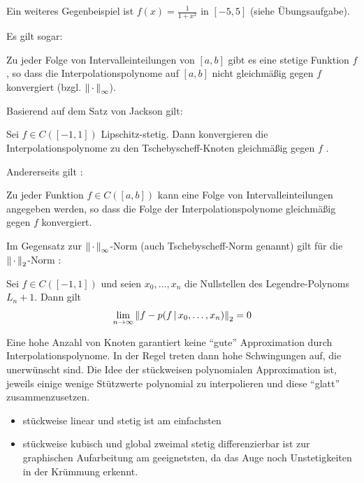 Ein weiteres Gegenbeispiel ist $f(x)=\frac{1}{1+x^2}$ in $[-5,5]$ 
(siehe Übungsaufgabe).

Es gilt sogar:

\begin{Satze}[Faber]
  Zu jeder Folge von Intervalleinteilungen von $[a,b]$
  gibt es eine stetige Funktion $f$ ,
  so dass die Interpolationspolynome auf $[a, b]$
  nicht gleichmäßig gegen $f$ konvergiert 
  (bzgl. $\left\| \,\cdot\, \right\|_\infty$).
\end{Satze}

Basierend auf dem Satz von Jackson gilt:
\begin{Satze}
  Sei $f\in C([-1,1])$ Lipschitz-stetig.
  Dann konvergieren die Interpolationspolynome
  zu den Tschebyscheff-Knoten gleichmäßig	gegen $f$ .
\end{Satze}

Andererseits gilt \cite[siehe][]{haemmerlinhoffmann}:
\begin{Satze}[Marcinkiewicz]
  Zu jeder Funktion $f\in C([a,b])$ kann eine Folge von
  Intervalleinteilungen angegeben werden,
  so dass die Folge der Interpolationspolynome gleichmäßig gegen $f$ konvergiert.
\end{Satze}

Im Gegensatz zur $\left\| \,\cdot\, \right\|_\infty$-Norm (auch Tschebyscheff-Norm genannt)
gilt für die $\left\| \,\cdot\, \right\|_2$-Norm \cite[siehe][]{haemmerlinhoffmann}:
\begin{Satze}
  Sei $f\in C([-1,1])$ und seien $x_0,\dots, x_n$ die Nullstellen
  des	Legendre-Polynoms $L_n+1$. Dann gilt
  \begin{gather*}
    \lim\limits_{n\rightarrow \infty}\left\| f-p(f\,|\,x_0,\dots, x_n) \right\|_2 = 0
  \end{gather*}
\end{Satze}


Eine hohe Anzahl von Knoten garantiert keine \enquote{gute}
Approximation durch Interpolationspolynome.
In der Regel treten dann hohe Schwingungen auf,
die unerwünscht sind.
Die Idee der stückweisen polynomialen Approximation ist,
jeweils einige wenige Stützwerte polynomial zu interpolieren
und diese \enquote{glatt} zusammenzusetzen.
\label{im6.2}
\begin{itemize}
\item stückweise linear und stetig ist am einfachsten
\item stückweise kubisch und global zweimal stetig differenzierbar
  ist zur graphischen Aufarbeitung am geeignetsten,
  da das Auge noch Unstetigkeiten in der Krümmung erkennt.
\end{itemize}


